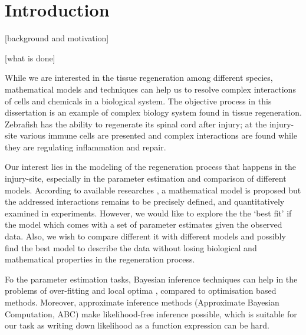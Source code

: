 \chapter{Introduction}



 [background and motivation]

 [what is done]

While we are interested in the tissue regeneration among different species, mathematical models and techniques can help us to resolve complex interactions of cells and chemicals in a biological system. The objective process in this dissertation is an example of complex biology system found in tissue regeneration. Zebrafish has the ability to regenerate its spinal cord after injury; at the injury-site various immune cells are presented and complex interactions are found while they are regulating inflammation and repair.

Our interest lies in the modeling of the regeneration process that happens in the injury-site, especially in the parameter estimation and comparison of different models. According to available researches \cite{ref:Tsarouchas}, a mathematical model is proposed but the addressed interactions remains to be precisely defined, and quantitatively examined in experiments. However, we would like to explore the the `best fit' if the model which comes with a set of parameter estimates given the observed data. Also, we wish to compare different it with different models and possibly find the best model to describe the data without losing biological and mathematical properties in the regeneration process.

Fo the parameter estimation tasks, Bayesian inference techniques can help in the problems of over-fitting and local optima \cite{ref:abcsysbio}, compared to optimisation based methods. Moreover, approximate inference methods (Approximate Bayesian Computation, ABC) make likelihood-free inference possible, which is suitable for our task as writing down likelihood as a function expression can be hard.

